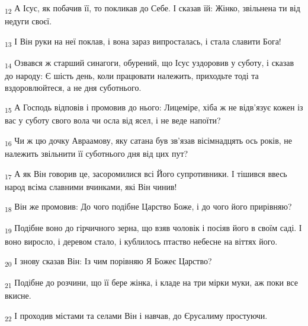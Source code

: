 \begin{tcolorbox}
\textsubscript{12} А Ісус, як побачив її, то покликав до Себе. І сказав їй: Жінко, звільнена ти від недуги своєї.
\end{tcolorbox}
\begin{tcolorbox}
\textsubscript{13} І Він руки на неї поклав, і вона зараз випросталась, і стала славити Бога!
\end{tcolorbox}
\begin{tcolorbox}
\textsubscript{14} Озвався ж старший синагоги, обурений, що Ісус уздоровив у суботу, і сказав до народу: Є шість день, коли працювати належить, приходьте тоді та вздоровлюйтеся, а не дня суботнього.
\end{tcolorbox}
\begin{tcolorbox}
\textsubscript{15} А Господь відповів і промовив до нього: Лицеміре, хіба ж не відв'язує кожен із вас у суботу свого вола чи осла від ясел, і не веде напоїти?
\end{tcolorbox}
\begin{tcolorbox}
\textsubscript{16} Чи ж цю дочку Авраамову, яку сатана був зв'язав вісімнадцять ось років, не належить звільнити її суботнього дня від цих пут?
\end{tcolorbox}
\begin{tcolorbox}
\textsubscript{17} А як Він говорив це, засоромилися всі Його супротивники. І тішився ввесь народ всіма славними вчинками, які Він чинив!
\end{tcolorbox}
\begin{tcolorbox}
\textsubscript{18} Він же промовив: До чого подібне Царство Боже, і до чого його прирівняю?
\end{tcolorbox}
\begin{tcolorbox}
\textsubscript{19} Подібне воно до гірчичного зерна, що взяв чоловік і посіяв його в своїм саді. І воно виросло, і деревом стало, і кублилось птаство небесне на віттях його.
\end{tcolorbox}
\begin{tcolorbox}
\textsubscript{20} І знову сказав Він: Із чим порівняю Я Божеє Царство?
\end{tcolorbox}
\begin{tcolorbox}
\textsubscript{21} Подібне до розчини, що її бере жінка, і кладе на три мірки муки, аж поки все вкисне.
\end{tcolorbox}
\begin{tcolorbox}
\textsubscript{22} І проходив містами та селами Він і навчав, до Єрусалиму простуючи.
\end{tcolorbox}
